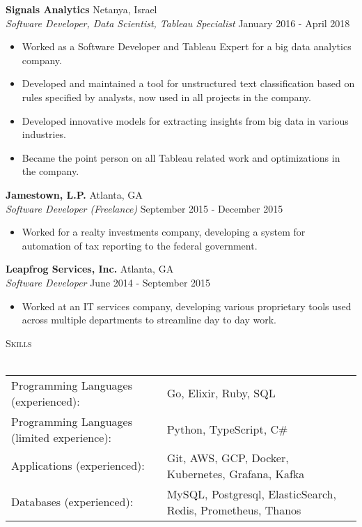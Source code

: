 \documentclass[a4paper]{article}
\newcommand{\lineunder} {
    \vspace*{-8pt} \\
    \hspace*{-18pt} \hrulefill \\
}
\newcommand{\header} [1] {
    {\hspace*{-18pt}\vspace*{6pt} \textsc{#1}}
    \vspace*{-6pt} \lineunder
}
\begin{document}
\textbf{Signals Analytics} \hfill Netanya, Israel\\
\textit{Software Developer, Data Scientist, Tableau Specialist} \hfill January 2016 - April 2018\\
\vspace{-1mm}
\begin{itemize} \itemsep 1pt
	\item Worked as a Software Developer and Tableau Expert for a big data analytics company.
	\item Developed and maintained a tool for unstructured text classification based on rules specified by analysts, now used in all projects in the company.
	\item Developed innovative models for extracting insights from big data in various industries.
	\item Became the point person on all Tableau related work and optimizations in the company.
\end{itemize}
\textbf{Jamestown, L.P.} \hfill Atlanta, GA\\
\textit{Software Developer (Freelance)} \hfill September 2015 - December 2015\\
\vspace{-1mm}
\begin{itemize} \itemsep 1pt
	\item Worked for a realty investments company, developing a system for automation of tax reporting to the federal government.
\end{itemize}
\textbf{Leapfrog Services, Inc.} \hfill Atlanta, GA\\
\textit{Software Developer} \hfill June 2014 - September 2015\\
\vspace{-1mm}
\begin{itemize} \itemsep 1pt
	\item Worked at an IT services company, developing various proprietary tools used across multiple departments to streamline day to day work.
\end{itemize}

\header{Skills}
\begin{tabular}{ l l }
	Programming Languages (experienced):        & Go, Elixir, Ruby, SQL                                       \\
	Programming Languages (limited experience): & Python, TypeScript, C\#                                     \\
	Applications (experienced):                 & Git, AWS, GCP, Docker, Kubernetes, Grafana, Kafka           \\
	Databases (experienced):                    & MySQL, Postgresql, ElasticSearch, Redis, Prometheus, Thanos \\
\end{tabular}
\vspace{2mm}
\end{document}
